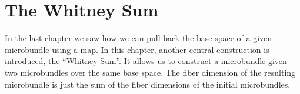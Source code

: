 \chapter{The Whitney Sum}\label{chapter::whitney}
\begin{myparagraph}
    In the last chapter we saw how we can pull back the base space of a given microbundle using a map.
    In this chapter, another central construction is introduced, the ``Whitney Sum''.
    It allows us to construct a microbundle given two microbundles over the same base space.
    The fiber dimension of the resulting microbundle is just the sum of the fiber dimensions of the initial microbundles.
\end{myparagraph}


